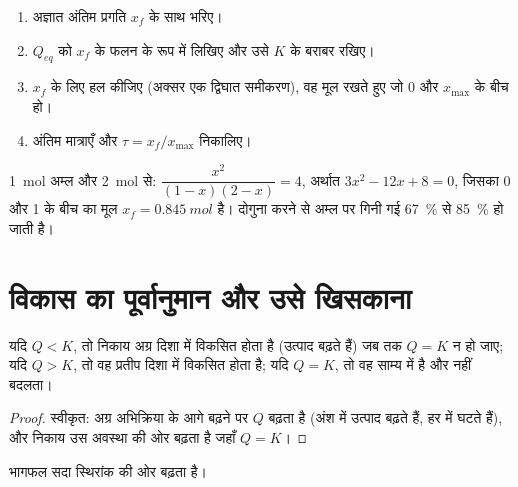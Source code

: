 \begin{method}[अपूर्ण अभिक्रिया की अंतिम अवस्था]\label{met:g12:equilibrium:final}
\begin{enumerate}
  \item अज्ञात अंतिम प्रगति $x_f$ के साथ  भरिए।
  \item $Q_{eq}$ को $x_f$ के फलन के रूप में लिखिए और उसे $K$ के बराबर रखिए।
  \item $x_f$ के लिए हल कीजिए (अक्सर एक द्विघात समीकरण), वह मूल रखते हुए
        जो 0 और $x_{\max}$ के बीच हो।
  \item अंतिम मात्राएँ और $\tau = x_f/x_{\max}$ निकालिए।
\end{enumerate}
\end{method}

\begin{example}[ऐल्कोहॉल की अधिकता]\label{ex:g12:equilibrium:excess}
\qty{1}{mol} अम्ल और \qty{2}{mol}  से:
$\dfrac{x^2}{(1-x)(2-x)} = 4$, अर्थात $3x^2 - 12x + 8 = 0$, जिसका
0 और 1 के बीच का मूल $x_f = \qty{0.845}{mol}$ है।  दोगुना करने से
अम्ल पर गिनी गई  \qty{67}{\percent} से
\qty{85}{\percent} हो जाती है।
\end{example}

\section{विकास का पूर्वानुमान और उसे खिसकाना}

\begin{proposition}[विकास की दिशा]\label{prop:g12:equilibrium:direction}
यदि $Q < K$, तो निकाय अग्र दिशा में विकसित होता है (उत्पाद
बढ़ते हैं) जब तक $Q = K$ न हो जाए; यदि $Q > K$, तो वह प्रतीप दिशा में विकसित होता है;
यदि $Q = K$, तो वह साम्य में है और नहीं बदलता।
\end{proposition}

\begin{proof}
स्वीकृत: अग्र अभिक्रिया के आगे बढ़ने पर $Q$ बढ़ता है (अंश में
उत्पाद बढ़ते हैं, हर में  घटते हैं), और निकाय
उस अवस्था की ओर बढ़ता है जहाँ $Q = K$।
\end{proof}

\begin{omfigure}

{\small भागफल सदा स्थिरांक की ओर बढ़ता है।}
\end{omfigure}

